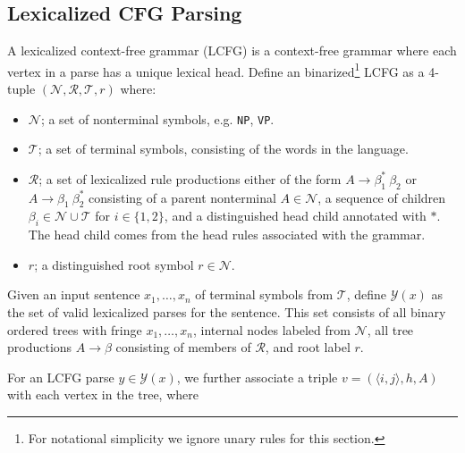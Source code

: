 \documentclass[11pt,letterpaper]{article}
\newcommand{\nonterms}{\mathcal{N}}
\newcommand{\rules}{\mathcal{R}}
\newcommand{\terms}{\mathcal{T}}
\newcommand{\Span}[1]{\langle #1 \rangle}
\newcommand{\Tag}[1]{\texttt{#1}}
\newcommand{\Root}{r}
\newcommand{\RuleA}[3]{#1 \rightarrow #2^*\ #3}
\newcommand{\RuleB}[3]{#1 \rightarrow #2\ #3^*}
\begin{document}
\subsection{Lexicalized CFG Parsing}

A lexicalized context-free grammar (LCFG) is a context-free grammar where each vertex in a parse has a unique lexical head. Define an binarized\footnote{For notational simplicity we ignore unary rules for this section.} LCFG as a 4-tuple $(\nonterms, \rules, \terms, \Root)$ where:
\begin{itemize}
\item $\nonterms$; a set of nonterminal symbols, e.g. \Tag{NP}, \Tag{VP}.
\item $\terms$; a set of terminal symbols, consisting of the words in the language.
\item $\rules$; a set of lexicalized rule productions either of the form $\RuleA{A}{\beta_1}{\beta_2}$ or $\RuleB{A}{\beta_1}{\beta_2}$  consisting of a parent nonterminal $A \in \nonterms$, a sequence of children $\beta_i \in \nonterms \cup \terms$ for $i \in \{1, 2\}$, and a distinguished head child annotated with $*$. The head child comes from the head rules associated with the grammar.
\item $\Root$; a distinguished root symbol $\Root \in \nonterms$.
\end{itemize}

Given an input sentence $x_1, \ldots, x_n$ of terminal symbols from $\terms$, define $\mathcal{Y}(x)$ as the set of valid lexicalized parses for the sentence. This set consists of all binary ordered trees with fringe $x_1, \ldots,  x_n$, internal nodes labeled from $\nonterms$, all tree productions  $A \rightarrow \beta$ consisting of members of $\rules$, and root label $\Root$.



For an LCFG parse $y \in \mathcal{Y}(x)$,
we further associate a triple $v = (\Span{i, j}, h, A)$ with each vertex in the tree, where
\end{document}
